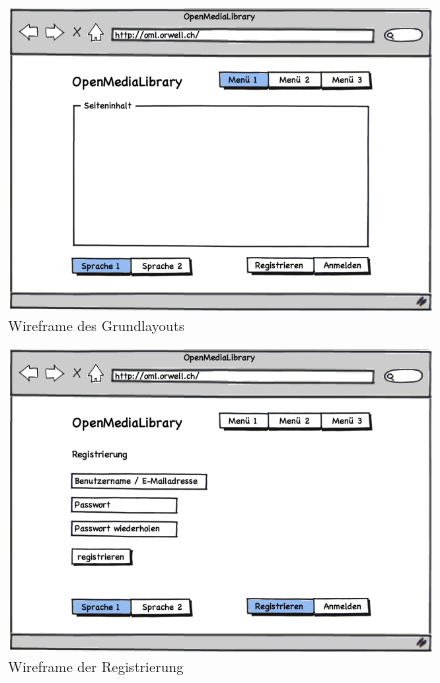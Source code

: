 \begin{figure}[p]
    \begin{center}
        \includegraphics[width=1\textwidth,angle=0]{./wireframes/01_grundlayout.png}
        \caption{Wireframe des Grundlayouts}
        \label{01_grundlayout}
    \end{center}
\end{figure}

\begin{figure}[p]
    \begin{center}
        \includegraphics[width=1\textwidth,angle=0]{./wireframes/02_registrierung.png}
        \caption{Wireframe der Registrierung}
        \label{02_registrierung}
    \end{center}
\end{figure}


